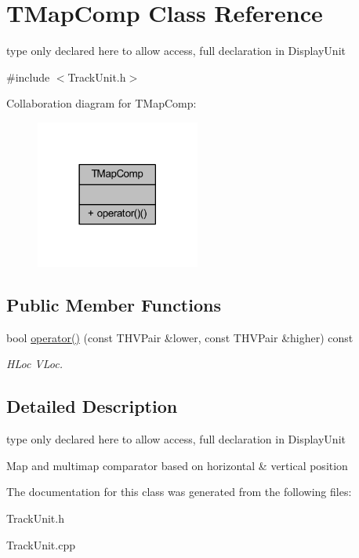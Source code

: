 \hypertarget{class_t_map_comp}{}\section{T\+Map\+Comp Class Reference}
\label{class_t_map_comp}


type only declared here to allow access, full declaration in Display\+Unit  




{\ttfamily \#include $<$Track\+Unit.\+h$>$}



Collaboration diagram for T\+Map\+Comp\+:\nopagebreak
\begin{figure}[H]
\begin{center}
\leavevmode
\includegraphics[width=153pt]{class_t_map_comp__coll__graph}
\end{center}
\end{figure}
\subsection*{Public Member Functions}
\begin{DoxyCompactItemize}
\item 
\mbox{\label{class_t_map_comp_a6784886eff8452405709d93063d74147}} 
bool \mbox{\hyperlink{class_t_map_comp_a6784886eff8452405709d93063d74147}{operator()}} (const T\+H\+V\+Pair \&lower, const T\+H\+V\+Pair \&higher) const
\begin{DoxyCompactList}\small\item\em H\+Loc V\+Loc. \end{DoxyCompactList}\end{DoxyCompactItemize}


\subsection{Detailed Description}
type only declared here to allow access, full declaration in Display\+Unit 

Map and multimap comparator based on horizontal \& vertical position 

The documentation for this class was generated from the following files\+:\begin{DoxyCompactItemize}
\item 
Track\+Unit.\+h\item 
Track\+Unit.\+cpp\end{DoxyCompactItemize}
